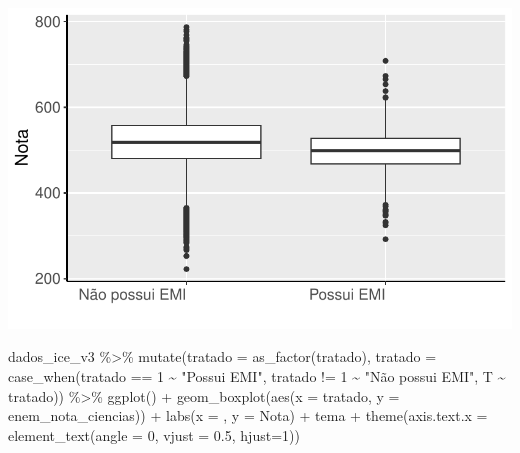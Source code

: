 \documentclass[
  letterpaper,
  DIV=11,
  numbers=noendperiod]{scrartcl}
\newenvironment{Shaded}{\begin{snugshade}}{\end{snugshade}}
\newcommand{\AttributeTok}[1]{\textcolor[rgb]{0.40,0.45,0.13}{#1}}
\newcommand{\DecValTok}[1]{\textcolor[rgb]{0.68,0.00,0.00}{#1}}
\newcommand{\FloatTok}[1]{\textcolor[rgb]{0.68,0.00,0.00}{#1}}
\newcommand{\FunctionTok}[1]{\textcolor[rgb]{0.28,0.35,0.67}{#1}}
\newcommand{\NormalTok}[1]{\textcolor[rgb]{0.00,0.23,0.31}{#1}}
\newcommand{\SpecialCharTok}[1]{\textcolor[rgb]{0.37,0.37,0.37}{#1}}
\newcommand{\StringTok}[1]{\textcolor[rgb]{0.13,0.47,0.30}{#1}}
\begin{document}
\includegraphics[width=1\textwidth,height=1\textheight]{script_files/figure-latex/unnamed-chunk-9-4.pdf}

\begin{Shaded}
\begin{Highlighting}[]
\NormalTok{dados\_ice\_v3 }\SpecialCharTok{\%\textgreater{}\%} 
  \FunctionTok{mutate}\NormalTok{(}\AttributeTok{tratado =} \FunctionTok{as\_factor}\NormalTok{(tratado),}
    \AttributeTok{tratado =} \FunctionTok{case\_when}\NormalTok{(tratado }\SpecialCharTok{==} \DecValTok{1} \SpecialCharTok{\textasciitilde{}} \StringTok{"Possui EMI"}\NormalTok{,}
\NormalTok{                        tratado }\SpecialCharTok{!=} \DecValTok{1} \SpecialCharTok{\textasciitilde{}} \StringTok{"Não possui EMI"}\NormalTok{,}
\NormalTok{                        T }\SpecialCharTok{\textasciitilde{}}\NormalTok{ tratado)) }\SpecialCharTok{\%\textgreater{}\%} 
  \FunctionTok{ggplot}\NormalTok{() }\SpecialCharTok{+}
  \FunctionTok{geom\_boxplot}\NormalTok{(}\FunctionTok{aes}\NormalTok{(}\AttributeTok{x =}\NormalTok{ tratado, }\AttributeTok{y =}\NormalTok{ enem\_nota\_ciencias)) }\SpecialCharTok{+}
  \FunctionTok{labs}\NormalTok{(}\AttributeTok{x =}  \StringTok{\textquotesingle{}\textquotesingle{}}\NormalTok{, }\AttributeTok{y =} \StringTok{\textquotesingle{}Nota\textquotesingle{}}\NormalTok{) }\SpecialCharTok{+}
\NormalTok{  tema }\SpecialCharTok{+}
  \FunctionTok{theme}\NormalTok{(}\AttributeTok{axis.text.x =} \FunctionTok{element\_text}\NormalTok{(}\AttributeTok{angle =} \DecValTok{0}\NormalTok{, }\AttributeTok{vjust =} \FloatTok{0.5}\NormalTok{, }\AttributeTok{hjust=}\DecValTok{1}\NormalTok{))}
\end{Highlighting}
\end{Shaded}
\end{document}
